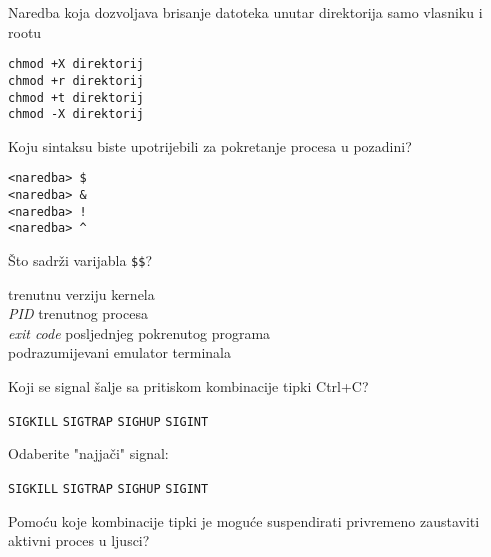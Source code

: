 \documentclass[a4paper,11pt]{exam}
\newcommand{\shell}[1]{\texttt{#1}}
\begin{document}
\begin{questions}
	\question
	Naredba koja dozvoljava brisanje datoteka unutar direktorija samo vlasniku i rootu 
	
	\begin{oneparchoices}
		\choice \shell{chmod +X direktorij} \\
		\choice \shell{chmod +r direktorij} \\
    	\CorrectChoice \shell{chmod +t direktorij}\\ 	
	  \choice \shell{chmod -X direktorij}
	\end{oneparchoices}

	\question
	Koju sintaksu biste upotrijebili za pokretanje procesa u pozadini?

	\begin{oneparchoices}
		\choice \shell{<naredba> \$} \\
		\CorrectChoice \shell{<naredba> \&} \\
		\choice \shell{<naredba> !} \\
		\choice \shell{<naredba> \textasciicircum} \\
	\end{oneparchoices}
	
	\question
  Što sadrži varijabla \shell{\$\$}?

	\begin{oneparchoices}
				\choice trenutnu verziju kernela\\
		\CorrectChoice \textit{PID} trenutnog procesa \\ 
		\choice \textit{exit code} posljednjeg pokrenutog programa\\
		\choice podrazumijevani emulator terminala
	\end{oneparchoices}
	
	\question
  Koji se signal šalje sa pritiskom kombinacije tipki Ctrl+C? 

  \begin{oneparchoices}
		\choice \shell{SIGKILL}
		\choice \shell{SIGTRAP}
    \choice \shell{SIGHUP}
    \CorrectChoice \shell{SIGINT}  
  \end{oneparchoices}

	\question
  Odaberite "najjači" signal:

  \begin{oneparchoices}
		\CorrectChoice \shell{SIGKILL}
		\choice \shell{SIGTRAP}
    \choice \shell{SIGHUP}
    \choice \shell{SIGINT}  
  \end{oneparchoices}


	\question
Pomoću koje kombinacije tipki je moguće suspendirati privremeno zaustaviti aktivni proces u ljusci?


\end{questions}
\end{document}
